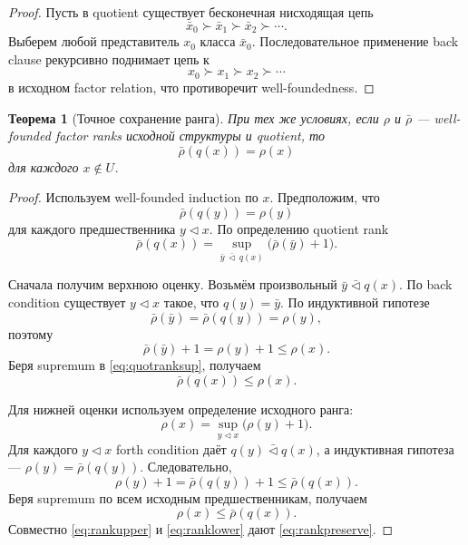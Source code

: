 \documentclass[11pt]{article}
\newtheorem{theorem}{Теорема}[section]
\theoremstyle{definition}
\theoremstyle{remark}
\begin{document}
\begin{proof}
Пусть в quotient существует бесконечная нисходящая цепь
\[
\bar x_0\succ\bar x_1\succ\bar x_2\succ\cdots.
\]
Выберем любой представитель \(x_0\) класса \(\bar x_0\). Последовательное применение back clause рекурсивно поднимает цепь к
\[
x_0\succ x_1\succ x_2\succ\cdots
\]
в исходном factor relation, что противоречит well-foundedness.
\end{proof}

\begin{theorem}[Точное сохранение ранга]
При тех же условиях, если \(\rho\) и \(\bar\rho\) — well-founded factor ranks исходной структуры и quotient, то
\begin{equation}
\boxed{\bar\rho(q(x))=\rho(x)}
\label{eq:rankpreserve}
\end{equation}
для каждого \(x\notin U\).
\end{theorem}

\begin{proof}
Используем well-founded induction по \(x\). Предположим, что
\[
\bar\rho(q(y))=\rho(y)
\]
для каждого предшественника \(y\triangleleft x\). По определению quotient rank
\begin{equation}
\bar\rho(q(x))
=
\sup_{\bar y\,\bar\triangleleft\,q(x)}
\bigl(\bar\rho(\bar y)+1\bigr).
\label{eq:quotranksup}
\end{equation}

Сначала получим верхнюю оценку. Возьмём произвольный \(\bar y\bar\triangleleft q(x)\). По back condition существует \(y\triangleleft x\) такое, что \(q(y)=\bar y\). По индуктивной гипотезе
\[
\bar\rho(\bar y)=\bar\rho(q(y))=\rho(y),
\]
поэтому
\[
\bar\rho(\bar y)+1=\rho(y)+1\le\rho(x).
\]
Беря supremum в \eqref{eq:quotranksup}, получаем
\begin{equation}
\bar\rho(q(x))\le\rho(x).
\label{eq:rankupper}
\end{equation}

Для нижней оценки используем определение исходного ранга:
\[
\rho(x)=\sup_{y\triangleleft x}\bigl(\rho(y)+1\bigr).
\]
Для каждого \(y\triangleleft x\) forth condition даёт \(q(y)\bar\triangleleft q(x)\), а индуктивная гипотеза — \(\rho(y)=\bar\rho(q(y))\). Следовательно,
\[
\rho(y)+1
=
\bar\rho(q(y))+1
\le
\bar\rho(q(x)).
\]
Беря supremum по всем исходным предшественникам, получаем
\begin{equation}
\rho(x)\le\bar\rho(q(x)).
\label{eq:ranklower}
\end{equation}
Совместно \eqref{eq:rankupper} и \eqref{eq:ranklower} дают \eqref{eq:rankpreserve}.
\end{proof}
\end{document}

